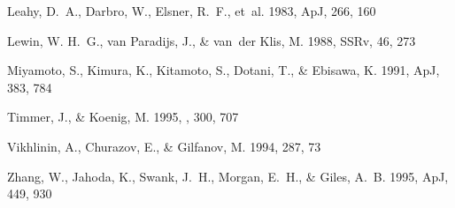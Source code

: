 \documentclass[twocolumn]{aastex61}
\begin{document}
\begin{thebibliography}{}
Leahy, D.~A., Darbro, W., Elsner, R.~F., {et~al.} 1983, ApJ, 266, 160

Lewin, W. H.~G., van Paradijs, J., \& van~der Klis, M. 1988, SSRv, 46, 273

Miyamoto, S., Kimura, K., Kitamoto, S., Dotani, T., \& Ebisawa, K. 1991, ApJ,
  383, 784

{Timmer}, J., \& {Koenig}, M. 1995, \aap, 300, 707

Vikhlinin, A., Churazov, E., \& Gilfanov, M. 1994, 287, 73

Zhang, W., Jahoda, K., Swank, J.~H., Morgan, E.~H., \& Giles, A.~B. 1995, ApJ,
  449, 930

\end{thebibliography}
\end{document}
